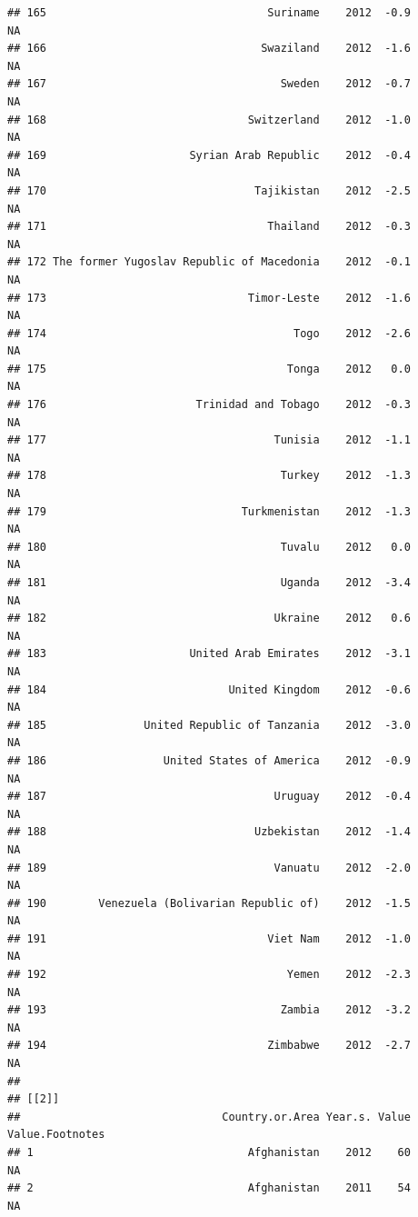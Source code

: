 \documentclass[
]{book}
\begin{document}
\begin{verbatim}
## 165                                  Suriname    2012  -0.9              NA
## 166                                 Swaziland    2012  -1.6              NA
## 167                                    Sweden    2012  -0.7              NA
## 168                               Switzerland    2012  -1.0              NA
## 169                      Syrian Arab Republic    2012  -0.4              NA
## 170                                Tajikistan    2012  -2.5              NA
## 171                                  Thailand    2012  -0.3              NA
## 172 The former Yugoslav Republic of Macedonia    2012  -0.1              NA
## 173                               Timor-Leste    2012  -1.6              NA
## 174                                      Togo    2012  -2.6              NA
## 175                                     Tonga    2012   0.0              NA
## 176                       Trinidad and Tobago    2012  -0.3              NA
## 177                                   Tunisia    2012  -1.1              NA
## 178                                    Turkey    2012  -1.3              NA
## 179                              Turkmenistan    2012  -1.3              NA
## 180                                    Tuvalu    2012   0.0              NA
## 181                                    Uganda    2012  -3.4              NA
## 182                                   Ukraine    2012   0.6              NA
## 183                      United Arab Emirates    2012  -3.1              NA
## 184                            United Kingdom    2012  -0.6              NA
## 185               United Republic of Tanzania    2012  -3.0              NA
## 186                  United States of America    2012  -0.9              NA
## 187                                   Uruguay    2012  -0.4              NA
## 188                                Uzbekistan    2012  -1.4              NA
## 189                                   Vanuatu    2012  -2.0              NA
## 190        Venezuela (Bolivarian Republic of)    2012  -1.5              NA
## 191                                  Viet Nam    2012  -1.0              NA
## 192                                     Yemen    2012  -2.3              NA
## 193                                    Zambia    2012  -3.2              NA
## 194                                  Zimbabwe    2012  -2.7              NA
## 
## [[2]]
##                               Country.or.Area Year.s. Value Value.Footnotes
## 1                                 Afghanistan    2012    60              NA
## 2                                 Afghanistan    2011    54              NA

\end{verbatim}
\end{document}
